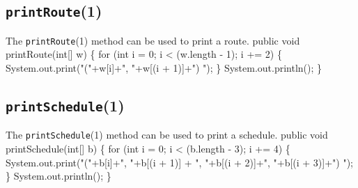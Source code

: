\documentclass{article}
\def\nwendcode{\endtrivlist \endgroup}      %
\let\nwdocspar=\par
\begin{document}
\subsection{{\tt{}\protect{}printRoute}(1)}
The {\tt{}\protect{}printRoute}(1) method can be used to print a route.
\nwenddocs{}\endmoddef{}
public void printRoute(int[] w) \{
  for (int i = 0; i < (w.length - 1); i += 2) \{
    System.out.print("("+w[i]+", "+w[(i + 1)]+") ");
  \}
  System.out.println();
\}
\eatline
{}\nwendcode{}\nwdocspar
\subsection{{\tt{}\protect{}printSchedule}(1)}
The {\tt{}\protect{}printSchedule}(1) method can be used to print a schedule.
\nwenddocs{}\endmoddef{}
public void printSchedule(int[] b) \{
  for (int i = 0; i < (b.length - 3); i += 4) \{
    System.out.print("("+b[i]+", "+b[(i + 1)]
      + ", "+b[(i + 2)]+", "+b[(i + 3)]+") ");
  \}
  System.out.println();
\}
\eatline
{}\nwendcode{}
\end{document}
